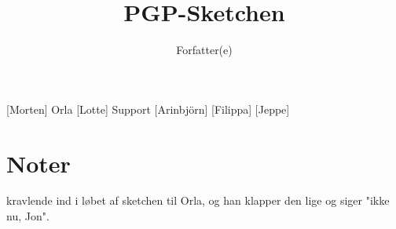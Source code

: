 \documentclass[a4paper,11pt]{article}
\title{PGP-Sketchen}
\author{Forfatter(e)}
\begin{document}
\maketitle

\begin{roles}
[Morten] Orla
[Lotte] Support
[Arinbjörn] 
[Filippa]
[Jeppe]


\end{roles} 

\section*{Noter}
kravlende ind i løbet af sketchen til Orla, og han klapper den lige og siger "ikke nu, Jon".

\begin{props}
\end{props}
\end{document}

